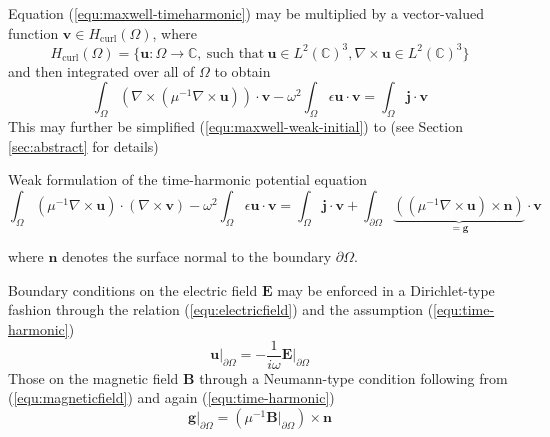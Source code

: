 \documentclass[11pt, a4paper]{article}
\begin{document}
Equation (\ref{equ:maxwell-timeharmonic}) may be multiplied by a vector-valued
function $\mathbf{v} \in H_{\textrm{curl}}(\Omega)$, where
\begin{equation}
    H_{\textrm{curl}}(\Omega) = \{\mathbf{u} : \Omega \to \mathbb{C},~\text{such that}~\mathbf{u}\in L^2(\mathbb{C})^3, \nabla \times \mathbf{u} \in L^2(\mathbb{C})^3\} \label{equ:h-curl}
\end{equation}
and then integrated over all of $\Omega$ to obtain 
\begin{equation}
    \int_{\Omega} (\nabla \times ({\mu^{-1} \nabla \times \mathbf{u}})) \cdot \mathbf{v}
    - \omega^2 \int_{\Omega} \epsilon \mathbf{u} \cdot \mathbf{v} = \int_{\Omega} \mathbf{j} \cdot \mathbf{v} \label{equ:maxwell-weak-initial}
\end{equation}
This may further be simplified (\ref{equ:maxwell-weak-initial}) to (see Section 
\ref{sec:abstract} for details)
\begin{fancybox}{Weak formulation of the time-harmonic potential equation}
    \begin{equation}
        \int_{\Omega} ({\mu^{-1} \nabla \times \mathbf{u}}) \cdot (\nabla \times \mathbf{v})
        - \omega^2 \int_{\Omega} \epsilon \mathbf{u} \cdot \mathbf{v} 
        = \int_{\Omega} \mathbf{j} \cdot \mathbf{v}
        + \int_{\partial \Omega} \underbrace{(({\mu^{-1} \nabla \times \mathbf{u}}) \times \mathbf{n})}_{= \mathbf{g}} \cdot \mathbf{v}
        \label{equ:maxwell-weak}
    \end{equation}
\end{fancybox}
where $\mathbf{n}$ denotes the surface normal to the boundary $\partial \Omega$.

Boundary conditions on the electric field $\mathbf{E}$ may be enforced in a Dirichlet-type
fashion through the relation (\ref{equ:electricfield}) and the assumption
(\ref{equ:time-harmonic})
\begin{equation}
    \left.\mathbf{u}\right|_{\partial \Omega} = -\frac{1}{i\omega} \left.\mathbf{E}\right|_{\partial \Omega} \label{equ:dirichlet-boundary}
\end{equation}
Those on the magnetic field $\mathbf{B}$ through a Neumann-type condition following
from (\ref{equ:magneticfield}) and again (\ref{equ:time-harmonic})
\begin{equation}
    \left.\mathbf{g}\right|_{\partial \Omega} = (\mu^{-1} \left.\mathbf{B}\right|_{\partial \Omega}) \times \mathbf{n} \label{equ:neumann-boundary}
\end{equation}
\end{document}
